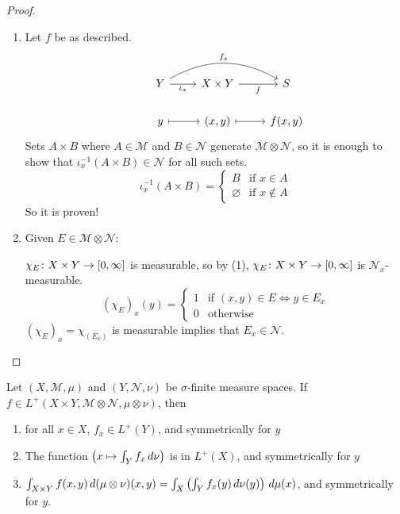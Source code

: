 \documentclass[11pt,leqno,oneside]{amsbook}
\numberwithin{thm}{section}
\newcommand{\M}{\mathcal{M}}
\newcommand{\cN}{\mathcal{N}}
\newcommand{\s}{$\sigma$-} %
\newcommand{\x}{\times}
\newcommand{\ox}{\otimes}
\renewcommand{\emptyset}{\varnothing}
\begin{document}
\begin{proof}
  \mbox{}
  \begin{enumerate}[label=(\arabic{*})]
    \item Let $f$ be as described.
    $$\begin{tikzcd}
      &Y \arrow[rr, bend left, "f_x"] \arrow[r, "\iota_x"'] &X \x Y \arrow[r, "f"'] &S \\
      &y \arrow[r, mapsto] &(x,y) \arrow[r, mapsto] &f(x,y)
    \end{tikzcd}$$
    Sets $A \x B$ where $A \in \M$ and $B \in \cN$ generate $\M \ox \cN$, so it is enough to show that $\iota^{-1}_x(A \x B) \in \cN$ for all such sets. $$\iota^{-1}_x(A \x B) = \begin{cases}
      B &\text{if $x \in A$} \\
      \emptyset &\text{if $x \not\in A$}
    \end{cases}$$
    So it is proven!

    \item Given $E \in \M \ox \cN$:

    $\chi_E\from X \x Y \to [0, \oo]$ is measurable, so by (1), $\chi_E \from X \x Y \to [0, \oo]$ is $\cN_x$-measurable. $$(\chi_E)_x(y) = \begin{cases}
      1 &\text{if $(x,y) \in E \iff y \in E_x$} \\
      0 &\text{otherwise}
    \end{cases}$$
    $(\chi_E)_x = \chi_{(E_x)}$ is measurable implies that $E_x \in \cN$.
  \end{enumerate}
\end{proof}
\begin{thm}
  Let $(X, \M, \mu)$ and $(Y, \cN, \nu)$ be \s finite measure spaces.  If $f \in L^+(X \x Y, \M \ox \cN, \mu \ox \nu)$, then
  \begin{enumerate}[label=(\arabic{*})]
    \item for all $x \in X$, $f_x \in L^+(Y)$, and symmetrically for $y$
    \item The function $\left(x \mapsto \int_Y f_x \, d\nu\right)$ is in $L^+(X)$, and symmetrically for $y$
    \item $\int_{X \x Y} f(x,y) \d(\mu \ox \nu)(x,y) = \int_X\left(\int_Y f_x(y) \d\nu(y)\right)\d\mu(x)$, and symmetrically for $y$.
  \end{enumerate}
\end{thm}
\end{document}
